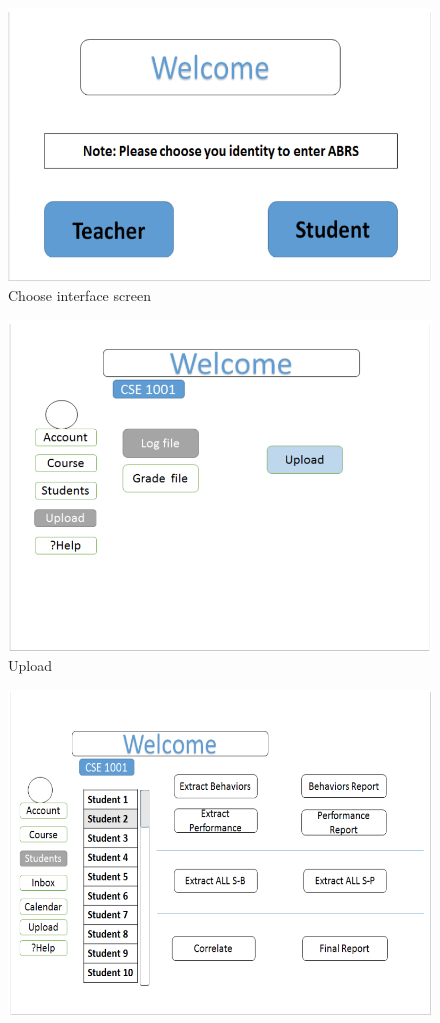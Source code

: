 \documentclass[12pt]{article}
\begin{document}
\begin{figure}
	\caption{Choose interface screen}
\includegraphics[width=\textwidth]{img/5} 
\end{figure}
\begin{figure}
\caption{Upload}
\includegraphics[width=\textwidth]{img/6} 
\end{figure}
\begin{figure}
\includegraphics[width=\textwidth]{img/7}
\end{figure}
\end{document}

